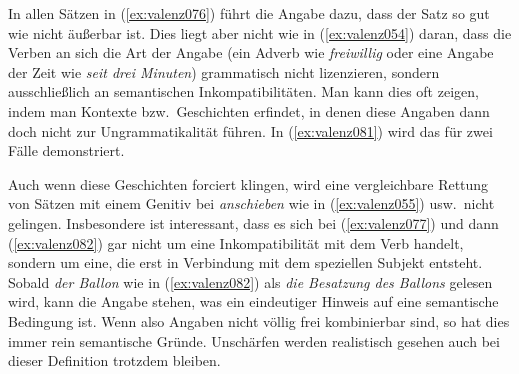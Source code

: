 \begin{exe}
  \ex\label{ex:valenz076}
  \begin{xlist}
  \end{xlist}
\end{exe}

In allen Sätzen in (\ref{ex:valenz076}) führt die Angabe dazu, dass der Satz so gut wie nicht äußerbar ist.
Dies liegt aber nicht wie in (\ref{ex:valenz054}) daran, dass die Verben an sich die Art der Angabe (\zB ein Adverb wie \textit{freiwillig} oder eine Angabe der Zeit wie \textit{seit drei Minuten}) grammatisch nicht lizenzieren, sondern ausschließlich an semantischen Inkompatibilitäten.
Man kann dies oft zeigen, indem man Kontexte bzw.\ Geschichten erfindet, in denen diese Angaben dann doch nicht zur Ungrammatikalität führen.
In (\ref{ex:valenz081}) wird das für zwei Fälle demonstriert.

\begin{exe}
  \ex\label{ex:valenz081}
  \begin{xlist}
  \end{xlist}
\end{exe}

Auch wenn diese Geschichten forciert klingen, wird eine vergleichbare Rettung von Sätzen mit einem Genitiv bei \textit{anschieben} wie in (\ref{ex:valenz055}) usw.\ nicht gelingen.
Insbesondere ist interessant, dass es sich bei (\ref{ex:valenz077}) und dann (\ref{ex:valenz082}) gar nicht um eine Inkompatibilität mit dem Verb handelt, sondern um eine, die erst in Verbindung mit dem speziellen Subjekt entsteht.
Sobald \textit{der Ballon} wie in (\ref{ex:valenz082}) als \textit{die Besatzung des Ballons} gelesen wird, kann die Angabe stehen, was ein eindeutiger Hinweis auf eine semantische Bedingung ist.
Wenn also Angaben nicht völlig frei kombinierbar sind, so hat dies immer rein semantische Gründe.
Unschärfen werden realistisch gesehen auch bei dieser Definition trotzdem bleiben.

